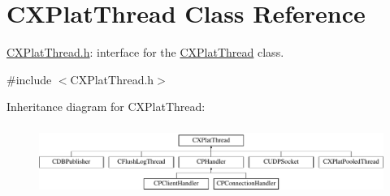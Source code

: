 \hypertarget{class_c_x_plat_thread}{\section{\-C\-X\-Plat\-Thread \-Class \-Reference}
\label{class_c_x_plat_thread}
}


\hyperlink{_c_x_plat_thread_8h}{\-C\-X\-Plat\-Thread.\-h}\-: interface for the \hyperlink{class_c_x_plat_thread}{\-C\-X\-Plat\-Thread} class.  




{\ttfamily \#include $<$\-C\-X\-Plat\-Thread.\-h$>$}

\-Inheritance diagram for \-C\-X\-Plat\-Thread\-:\begin{figure}[H]
\begin{center}
\leavevmode
\includegraphics[height=2.301370cm]{class_c_x_plat_thread}
\end{center}
\end{figure}
